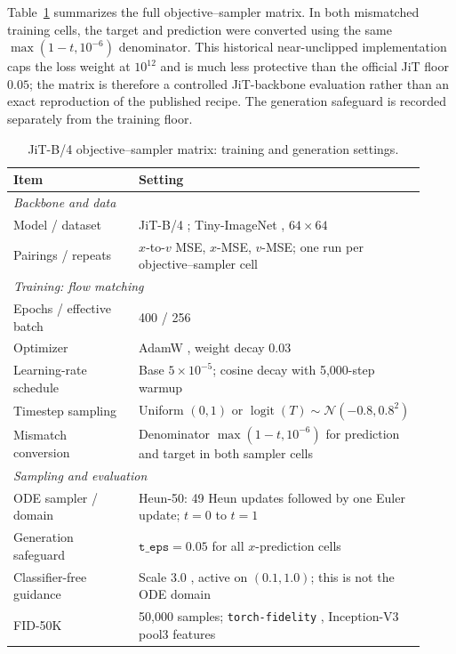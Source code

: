 \documentclass{article}
\theoremstyle{plain}
\theoremstyle{definition}
\theoremstyle{remark}
\begin{document}
Table~\ref{tab:jit_settings} summarizes the full objective--sampler matrix. In both mismatched training cells, the target and prediction were converted using the same $\max(1-t,10^{-6})$ denominator. This historical near-unclipped implementation caps the loss weight at $10^{12}$ and is much less protective than the official JiT floor $0.05$; the matrix is therefore a controlled JiT-backbone evaluation rather than an exact reproduction of the published recipe. The generation safeguard is recorded separately from the training floor.

\begin{table}[!ht]
\centering
\small
\caption{JiT-B/4 objective--sampler matrix: training and generation settings.}
\label{tab:jit_settings}
\begin{tabular}{p{0.28\linewidth} p{0.64\linewidth}}
\toprule
\textbf{Item} & \textbf{Setting} \\
\midrule
\multicolumn{2}{l}{\textit{Backbone and data}} \\
Model / dataset & JiT-B/4 \citep{li2025back}; Tiny-ImageNet \citep{le2015tinyimagenet}, $64\times64$ \\
Pairings / repeats & $x$-to-$v$ MSE, $x$-MSE, $v$-MSE; one run per objective--sampler cell \\
\midrule
\multicolumn{2}{l}{\textit{Training: flow matching}} \\
Epochs / effective batch & 400 / 256 \\
Optimizer & AdamW \citep{loshchilov2017adamw}, weight decay 0.03 \\
Learning-rate schedule & Base $5\times10^{-5}$; cosine decay with 5,000-step warmup \\
Timestep sampling & Uniform $(0,1)$ or $\operatorname{logit}(T)\sim\mathcal N(-0.8,0.8^2)$ \\
Mismatch conversion & Denominator $\max(1-t,10^{-6})$ for prediction and target in both sampler cells \\
\midrule
\multicolumn{2}{l}{\textit{Sampling and evaluation}} \\
ODE sampler / domain & Heun-50: 49 Heun updates followed by one Euler update; $t=0$ to $t=1$ \\
Generation safeguard & $\texttt{t\_eps}=0.05$ for all $x$-prediction cells \\
Classifier-free guidance & Scale 3.0 \citep{ho2022classifierfree}, active on $(0.1,1.0)$; this is not the ODE domain \\
FID-50K & 50,000 samples; \texttt{torch-fidelity} \citep{obukhov2020torchfidelity}, Inception-V3 pool3 features \\
\bottomrule
\end{tabular}
\end{table}
\end{document}
